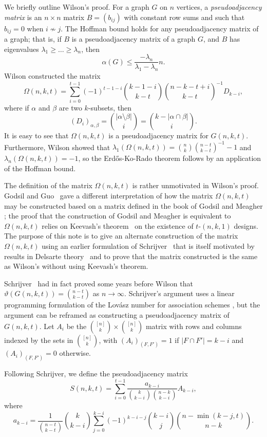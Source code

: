 \documentclass[12pt]{article}
\theoremstyle{definition}
\theoremstyle{remark}
\begin{document}
We briefly outline Wilson's proof. For a graph $G$ on $n$ vertices, a \emph{pseudoadjacency matrix} is an $n\times n$ matrix $B=(b_{ij})$ with constant row sums and such that $b_{ij} = 0$ when $i\not\sim j$. The Hoffman bound holds for any pseudoadjacency matrix of a graph; that is, if $B$ is a pseudoadjacency matrix of a graph $G$, and $B$ has eigenvalues $\lambda_1 \ge \ldots \ge \lambda_n$, then 
\[\alpha(G) \le \frac{-\lambda_n}{\lambda_1 - \lambda_n} n.\]
Wilson constructed the matrix \[\Omega(n, k, t) = \sum_{i=0}^{t-1}(-1)^{t-1-i}\binom{k-1-i}{k-t}\binom{n-k-t+i}{k-t}^{-1}D_{k-i},\]
where if $\alpha$ and $\beta$ are two $k$-subsets, then
\[(D_i)_{\alpha, \beta} = \binom{|\alpha \setminus \beta|}{i} = \binom{k-|\alpha \cap \beta|}{i}.\] It is easy to see that $\Omega(n, k, t)$ is a pseudoadjacency matrix for $G(n, k, t)$. Furthermore, Wilson showed that $\lambda_1(\Omega(n, k, t)) = \binom{n}{k}\binom{n-t}{k-t}^{-1} - 1$ and $\lambda_n(\Omega(n, k, t))= -1$, so the Erd\H{o}s-Ko-Rado theorem follows by an application of the Hoffman bound. 

The definition of the matrix $\Omega(n, k, t)$ is rather unmotivated in Wilson's proof. Godsil and Guo~\cite{GG} gave a different interpretation of how the matrix $\Omega(n, k, t)$ may be constructed based on a matrix defined in the book of Godsil and Meagher \cite[pg.~159]{GM}; the proof that the construction of Godsil and Meagher is equivalent to $\Omega(n, k, t)$ relies on Keevash's theorem~\cite{Kee} on the existence of $t$-$(n, k, 1)$ designs. The purpose of this note is to give an alternate construction of the matrix $\Omega(n, k, t)$ using an earlier formulation of Schrijver~\cite{Sch1978} that is itself motivated by results in Delsarte theory~\cite{Del} and to prove that the matrix constructed is the same as Wilson's without using Keevash's theorem. 

Schrijver~\cite{Sch1978} had in fact proved some years before Wilson that $\vartheta(G(n, k, t)) = \binom{n-t}{k-t}$ as $n \rightarrow \infty$. Schrijver's argument uses a linear programming formulation of the Lov\'asz number for association schemes \cite{Sch}, but the argument can be reframed as constructing a pseudoadjacency matrix of $G(n, k, t)$.  Let $A_i$ be the $\binom{[n]}{k} \times \binom{[n]}{k}$ matrix with rows and columns indexed by the sets in $\binom{[n]}{k}$, with $(A_i)_{(F, F')} =  1$  if $ |F\cap F'| = k -i$ and $(A_i)_{(F, F')} = 0$ otherwise.

Following Schrijver, we define the pseudoadjacency matrix 
\[S(n, k, t) = \sum_{i=0}^{t-1}\frac{a_{k-i}}{\binom{k}{k-i}\binom{n-k}{k-i}}A_{k-i},\]
where
\begin{equation}\label{akellieqn}
a_{k-i} = \frac{1}{\binom{n-t}{k-t}}\binom{k}{k-i}\sum_{j=0}^{k-i}(-1)^{k-i-j}\binom{k-i}{j}\binom{n-\min(k-j, t)}{n-k}.
\end{equation}
\end{document}
